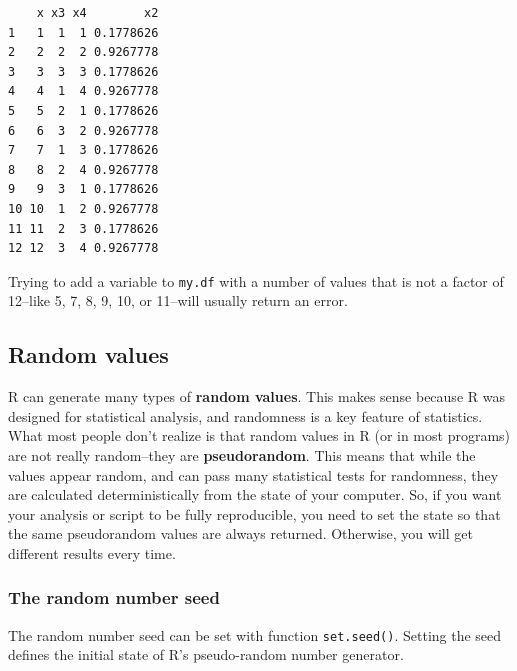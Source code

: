 \documentclass[
  13,
  letterpaper,
]{report}
\newenvironment{Shaded}{\begin{snugshade}}{\end{snugshade}}
\newcommand{\CommentTok}[1]{\textcolor[rgb]{0.37,0.37,0.37}{#1}}
\newcommand{\DecValTok}[1]{\textcolor[rgb]{0.68,0.00,0.00}{#1}}
\newcommand{\NormalTok}[1]{\textcolor[rgb]{0.00,0.23,0.31}{#1}}
\newcommand{\OtherTok}[1]{\textcolor[rgb]{0.00,0.23,0.31}{#1}}
\newcommand{\SpecialCharTok}[1]{\textcolor[rgb]{0.37,0.37,0.37}{#1}}
\begin{document}
\begin{verbatim}
    x x3 x4        x2
1   1  1  1 0.1778626
2   2  2  2 0.9267778
3   3  3  3 0.1778626
4   4  1  4 0.9267778
5   5  2  1 0.1778626
6   6  3  2 0.9267778
7   7  1  3 0.1778626
8   8  2  4 0.9267778
9   9  3  1 0.1778626
10 10  1  2 0.9267778
11 11  2  3 0.1778626
12 12  3  4 0.9267778
\end{verbatim}

Trying to add a variable to \texttt{my.df} with a number of values that
is not a factor of 12--like 5, 7, 8, 9, 10, or 11--will usually return
an error.

\begin{Shaded}
\end{Shaded}

\subsection{Random values}\label{sec-05-make-rand}

R can generate many types of \textbf{random values}. This makes sense
because R was designed for statistical analysis, and randomness is a key
feature of statistics. What most people don't realize is that random
values in R (or in most programs) are not really random--they are
\textbf{pseudorandom}. This means that while the values appear random,
and can pass many statistical tests for randomness, they are calculated
deterministically from the state of your computer. So, if you want your
analysis or script to be fully reproducible, you need to set the state
so that the same pseudorandom values are always returned. Otherwise, you
will get different results every time.

\subsubsection{The random number seed}\label{sec-05-make-rand-seed}

The random number seed can be set with function \texttt{set.seed()}.
Setting the seed defines the initial state of R's pseudo-random number
generator.
\end{document}
